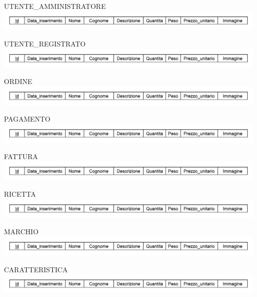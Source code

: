 UTENTE\_AMMINISTRATORE\\
\includegraphics[height=0.04\textheight]{immagini/traduzione_prodotto}
	
UTENTE\_REGISTRATO\\		\includegraphics[height=0.04\textheight]{immagini/traduzione_prodotto}

ORDINE\\
\includegraphics[height=0.04\textheight]{immagini/traduzione_prodotto}
		
PAGAMENTO\\
\includegraphics[height=0.04\textheight]{immagini/traduzione_prodotto}
	
FATTURA\\
\includegraphics[height=0.04\textheight]{immagini/traduzione_prodotto}
		
RICETTA\\
\includegraphics[height=0.04\textheight]{immagini/traduzione_prodotto}
		
MARCHIO\\
\includegraphics[height=0.04\textheight]{immagini/traduzione_prodotto}
		
CARATTERISTICA\\
\includegraphics[height=0.04\textheight]
{immagini/traduzione_prodotto}
		
